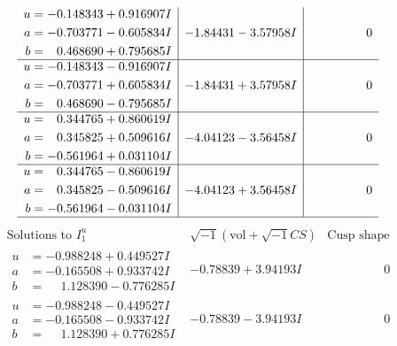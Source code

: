 \documentclass[1p]{elsarticle_modified}
\theoremstyle{definition}
\newcommand{\I}{\sqrt{-1}}
\begin{document}
$$\begin{array}{c|c|c}
\begin{aligned}
u &= -0.148343 + 0.916907 I \\
a &= -0.703771 - 0.605834 I \\
b &= \phantom{-}0.468690 + 0.795685 I\end{aligned}
 & -1.84431 - 3.57958 I & \phantom{-0.000000 } 0 \\ \hline\begin{aligned}
u &= -0.148343 - 0.916907 I \\
a &= -0.703771 + 0.605834 I \\
b &= \phantom{-}0.468690 - 0.795685 I\end{aligned}
 & -1.84431 + 3.57958 I & \phantom{-0.000000 } 0 \\ \hline\begin{aligned}
u &= \phantom{-}0.344765 + 0.860619 I \\
a &= \phantom{-}0.345825 + 0.509616 I \\
b &= -0.561964 + 0.031104 I\end{aligned}
 & -4.04123 - 3.56458 I & \phantom{-0.000000 } 0 \\ \hline\begin{aligned}
u &= \phantom{-}0.344765 - 0.860619 I \\
a &= \phantom{-}0.345825 - 0.509616 I \\
b &= -0.561964 - 0.031104 I\end{aligned}
 & -4.04123 + 3.56458 I & \phantom{-0.000000 } 0\\
 \hline 
 \end{array}$$\newpage$$\begin{array}{c|c|c}  
\text{Solutions to }I^u_{1}& \I (\text{vol} + \sqrt{-1}CS) & \text{Cusp shape}\\
 \hline 
\begin{aligned}
u &= -0.988248 + 0.449527 I \\
a &= -0.165508 + 0.933742 I \\
b &= \phantom{-}1.128390 - 0.776285 I\end{aligned}
 & -0.78839 + 3.94193 I & \phantom{-0.000000 } 0 \\ \hline\begin{aligned}
u &= -0.988248 - 0.449527 I \\
a &= -0.165508 - 0.933742 I \\
b &= \phantom{-}1.128390 + 0.776285 I\end{aligned}
 & -0.78839 - 3.94193 I & \phantom{-0.000000 } 0 \\ \hline\begin{aligned}

\end{aligned}
\end{array}$$
\end{document}
